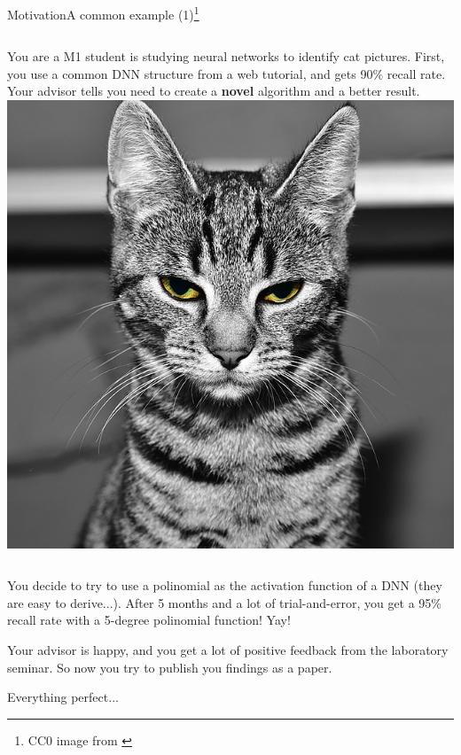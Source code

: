 \documentclass[t]{beamer}
\begin{document}
\begin{ftst}
  {Motivation}{A common example (1)\footnote{CC0 image from
      \href{https://pixabay.com/en/cat-pet-animal-cute-cat-cat-s-eyes-1360682/}{}}}

  \begin{columns}[T]

    {\small You are a M1 student is studying neural networks to
      identify cat pictures. First, you use a common DNN structure
      from a web tutorial, and gets 90\% recall rate. Your advisor
      tells you need to create a {\bf novel} algorithm and a
      better result.}  
    \includegraphics[width=1\textwidth]{../../../figs/cat}
  \end{columns}

  \vfill
  
  {\small

    You decide to try to use a polinomial as the activation function
    of a DNN (they are easy to derive...). After 5 months and a lot of
    trial-and-error, you get a 95\% recall rate with a 5-degree
    polinomial function! Yay!

    \vone

    Your advisor is happy, and you get a lot of positive feedback from
    the laboratory seminar. So now you try to publish you findings as
    a paper.

    \vone

    Everything perfect...}

\end{ftst}
\end{document}
